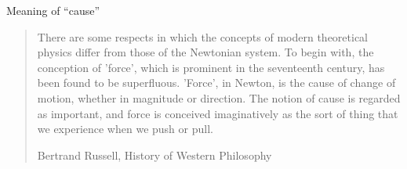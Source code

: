 \documentclass[aspectratio=169]{beamer}
\theoremstyle{Definition}
\begin{document}
\begin{frame}{Meaning of   ``cause''}
%
\begin{quote}


There are some respects in which the concepts of modern theoretical physics differ from those of the Newtonian system. To begin with, the conception of 'force', which is prominent in the seventeenth century, has been found to be superfluous. 'Force', in Newton, is the cause of change of motion, whether in magnitude or direction. The notion of cause is regarded as important, and force is conceived imaginatively as the sort of thing that we experience when we push or pull.

\bigskip

\quad \quad Bertrand Russell, History of Western Philosophy


\end{quote}


\end{frame}
\end{document}
